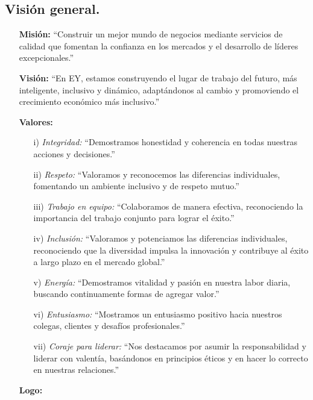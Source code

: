\documentclass{article}
\begin{document}
\subsection{Visión general.}

\begin{itemize}
\item[\textbf{Misión:}] ``Construir un mejor mundo de negocios mediante servicios de calidad que fomentan la confianza en los mercados y el desarrollo de líderes excepcionales.''

\item[\textbf{Visión:}] ``En EY, estamos construyendo el lugar de trabajo del futuro, más inteligente, inclusivo y dinámico, adaptándonos al cambio y promoviendo el crecimiento económico más inclusivo.''

\item[\textbf{Valores:}] 

\begin{enumerate}
    
    \item[i)] \emph{Integridad:} ``Demostramos honestidad y coherencia en todas nuestras acciones y decisiones.''  
    \item[ii)] \emph{Respeto:} ``Valoramos y reconocemos las diferencias individuales, fomentando un ambiente inclusivo y de respeto mutuo.'' 
    \item[iii)] \emph{Trabajo en equipo:} ``Colaboramos de manera efectiva, reconociendo la importancia del trabajo conjunto para lograr el éxito.''
    \item[iv)] \emph{Inclusión:} ``Valoramos y potenciamos las diferencias individuales, reconociendo que la diversidad impulsa la innovación y contribuye al éxito a largo plazo en el mercado global.''
    \item[v)] \emph{Energía:}  ``Demostramos vitalidad y pasión en nuestra labor diaria, buscando continuamente formas de agregar valor.''
    \item[vi)] \emph{Entusiasmo:} ``Mostramos un entusiasmo positivo hacia nuestros colegas, clientes y desafíos profesionales.''
    \item[vii)] \emph{Coraje para liderar:}  ``Nos destacamos por asumir la responsabilidad y liderar con valentía, basándonos en principios éticos y en hacer lo correcto en nuestras relaciones.''
   
\end{enumerate}

\item[\textbf{Logo:}]
\end{itemize}
\end{document}
